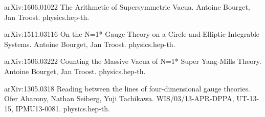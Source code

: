 \documentclass[12pt]{article}
\begin{document}
\begin{thebibliography}{}

\item arXiv:1606.01022 The Arithmetic of Supersymmetric Vacua. Antoine Bourget, Jan Troost. physics.hep-th.



\item arXiv:1511.03116 On the N=1* Gauge Theory on a Circle and Elliptic Integrable Systems. Antoine Bourget, Jan Troost. physics.hep-th.


\item arXiv:1506.03222 Counting the Massive Vacua of N=1* Super Yang-Mills Theory. Antoine Bourget, Jan Troost. physics.hep-th.

\item arXiv:1305.0318 Reading between the lines of four-dimensional gauge theories. Ofer Aharony, Nathan Seiberg, Yuji Tachikawa. WIS/03/13-APR-DPPA, UT-13-15, IPMU13-0081. physics.hep-th.



\end{thebibliography}
\end{document}
